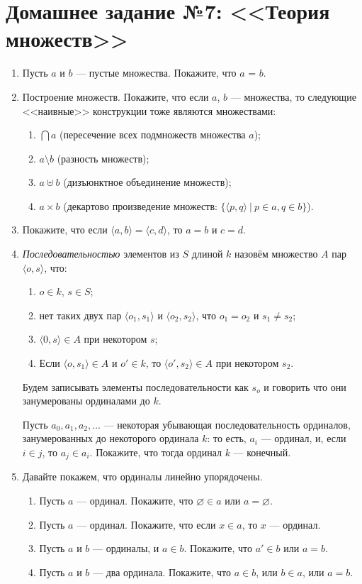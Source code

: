 \documentclass[10pt,a4paper,oneside]{article}
\begin{document}
\section*{Домашнее задание №7: <<Теория множеств>>}

\begin{enumerate}
\item Пусть $a$ и $b$ --- пустые множества. Покажите, что $a$ = $b$.

\item Построение множеств. Покажите, что если $a$, $b$ --- множества, то следующие <<наивные>>
конструкции тоже являются множествами:
\begin{enumerate}
\item $\bigcap a$ (пересечение всех подмножеств множества $a$);
\item $a \setminus b$ (разность множеств);
\item $a \uplus b$ (дизъюнктное объединение множеств);
\item $a \times b$ (декартово произведение множеств: $\{\langle p,q\rangle\ |\ p\in a, q\in b\}$).
\end{enumerate}

\item Покажите, что если $\langle a,b \rangle = \langle c,d\rangle$, то $a=b$ и $c=d$.

\item \emph{Последовательностью} элементов из $S$ длиной $k$ назовём 
множество $A$ пар $\langle o, s\rangle$, что:
\begin{enumerate}
\item $o\in k$, $s \in S$;
\item нет таких двух пар $\langle o_1, s_1\rangle$ и $\langle o_2, s_2\rangle$, что $o_1 = o_2$ и $s_1 \ne s_2$;
\item $\langle 0, s\rangle \in A$ при некотором $s$;
\item Если $\langle o, s_1 \rangle \in A$ и $o' \in k$, то $\langle o', s_2 \rangle \in A$ при некотором $s_2$.
\end{enumerate}
Будем записывать элементы последовательности как $s_o$ и говорить что
они занумерованы ординалами до $k$.

Пусть $a_0, a_1, a_2, \dots$ --- некоторая убывающая последовательность ординалов,
занумерованных до некоторого ординала $k$:
то есть, $a_i$ --- ординал, и, если $i \in j$, то $a_j \in a_i$. 
Покажите, что тогда ординал $k$ --- конечный.

\item Давайте покажем, что ординалы линейно упорядочены.
\begin{enumerate}
\item Пусть $a$ --- ординал. Покажите, что $\varnothing \in a$ или $a = \varnothing$.
\item Пусть $a$ --- ординал. Покажите, что если $x \in a$, то $x$ --- ординал.
\item Пусть $a$ и $b$ --- ординалы, и $a \in b$. Покажите, что $a' \in b$ или $a = b$.
\item Пусть $a$ и $b$ --- два ординала. Покажите, что $a\in b$, или $b \in a$, или $a = b$.
\end{enumerate}                                      


\end{enumerate}
\end{document}
